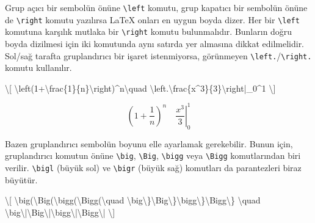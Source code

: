 \documentclass[
  10pt,
]{scrbook}
\newenvironment{Shaded}{\begin{snugshade}}{\end{snugshade}}
\newcommand{\SpecialCharTok}[1]{\textcolor[rgb]{0.00,0.00,0.00}{#1}}
\newcommand{\SpecialStringTok}[1]{\textcolor[rgb]{0.31,0.60,0.02}{#1}}
\theoremstyle{definition}
\theoremstyle{definition}
\theoremstyle{definition}
\theoremstyle{definition}
\theoremstyle{remark}
\begin{document}
Grup açıcı bir sembolün önüne \texttt{\textbackslash{}left} komutu, grup kapatıcı bir sembolün önüne de \texttt{\textbackslash{}right} komutu yazılırsa LaTeX onları en uygun boyda dizer. Her bir \texttt{\textbackslash{}left} komutuna karşılık mutlaka bir \texttt{\textbackslash{}right} komutu bulunmalıdır. Bunların doğru boyda dizilmesi için iki komutunda aynı satırda yer almasına dikkat edilmelidir. Sol/sağ tarafta gruplandırıcı bir işaret istenmiyorsa, görünmeyen \texttt{\textbackslash{}left.}/\texttt{\textbackslash{}right.} komutu kullanılır.

\begin{Shaded}
\begin{Highlighting}[]
\SpecialStringTok{\textbackslash{}[}
\SpecialCharTok{\textbackslash{}left}\SpecialStringTok{(1+}\SpecialCharTok{\textbackslash{}frac}\SpecialStringTok{\{1\}\{n\}}\SpecialCharTok{\textbackslash{}right}\SpecialStringTok{)\^{}n}\SpecialCharTok{\textbackslash{}quad}
\SpecialCharTok{\textbackslash{}left}\SpecialStringTok{.}\SpecialCharTok{\textbackslash{}frac}\SpecialStringTok{\{x\^{}3\}\{3\}}\SpecialCharTok{\textbackslash{}right}\SpecialStringTok{|\_0\^{}1}
\SpecialStringTok{\textbackslash{}]}
\end{Highlighting}
\end{Shaded}

\[
\left(1+\frac{1}{n}\right)^n\quad
\left.\frac{x^3}{3}\right|_0^1
\]

Bazen gruplandırıcı sembolün boyunu elle ayarlamak gerekebilir. Bunun için, gruplandırıcı komutun önüne \texttt{\textbackslash{}big}, \texttt{\textbackslash{}Big}, \texttt{\textbackslash{}bigg} veya \texttt{\textbackslash{}Bigg} komutlarından biri verilir. \texttt{\textbackslash{}bigl} (büyük sol) ve \texttt{\textbackslash{}bigr} (büyük sağ) komutları da parantezleri biraz büyütür.

\begin{Shaded}
\begin{Highlighting}[]
\SpecialStringTok{\textbackslash{}[}
\SpecialCharTok{\textbackslash{}big}\SpecialStringTok{(}\SpecialCharTok{\textbackslash{}Big}\SpecialStringTok{(}\SpecialCharTok{\textbackslash{}bigg}\SpecialStringTok{(}\SpecialCharTok{\textbackslash{}Bigg}\SpecialStringTok{(}\SpecialCharTok{\textbackslash{}quad}
\SpecialCharTok{\textbackslash{}big\textbackslash{}\}\textbackslash{}Big\textbackslash{}\}\textbackslash{}bigg\textbackslash{}\}\textbackslash{}Bigg\textbackslash{}\}}
\SpecialCharTok{\textbackslash{}quad}
\SpecialCharTok{\textbackslash{}big\textbackslash{}|\textbackslash{}Big\textbackslash{}|\textbackslash{}bigg\textbackslash{}|\textbackslash{}Bigg\textbackslash{}|}
\SpecialStringTok{\textbackslash{}]}
\end{Highlighting}
\end{Shaded}
\end{document}
